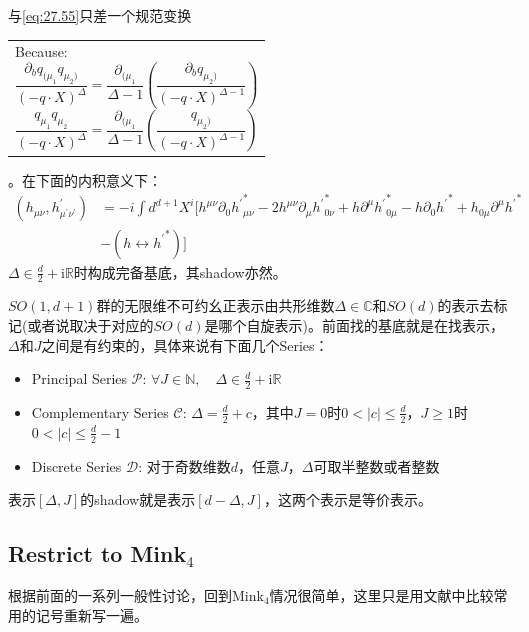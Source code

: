 与\ref{eq:27.55}只差一个规范变换\begin{margintable}\footnotesize 
	\begin{tabularx}{\marginparwidth}{|X}
		Because:
		\[\frac{\partial_bq_{(\mu_1}q_{\mu_2)}}{(-q\cdot X)^\Delta}=\frac{\partial_{(\mu_1}}{\Delta-1}\left(\frac{\partial_bq_{\mu_2)}}{(-q\cdot X)^{\Delta-1}}\right)\]
		\[\frac{q_{\mu_1}q_{\mu_2}}{(-q\cdot X)^\Delta}=\frac{\partial_{(\mu_1}}{\Delta-1}\left(\frac{q_{\mu_2)}}{(-q\cdot X)^{\Delta-1}}\right)\]
	\end{tabularx}
\end{margintable}。在下面的内积意义下：
\begin{equation}
	\begin{aligned}
		(h_{\mu\nu},h_{\mu^{\prime}\nu^{\prime}}^{\prime})& =-i\int d^{d+1}X^{i}\Big[h^{\mu\nu}\partial_{0}{h^{\prime}}_{\mu\nu}^{*}-2h^{\mu\nu}\partial_{\mu}{h^{\prime}}_{0\nu}^{*}+h\partial^{\mu}{h^{\prime}}_{0\mu}^{*}-h\partial_{0}{h^{\prime}}^{*}+h_{0\mu}{\partial^{\mu}{h^{\prime}}^{*}}  \\
		&-(h\leftrightarrow{h^{\prime}}^{*})\Big]
	\end{aligned}
\end{equation}
$\boxed{\Delta\in\frac{d}{2}+\mathrm{i}\mathbb{R}}$时构成完备基底，其shadow亦然。
\begin{remark}
	$SO(1,d+1)$群的无限维不可约幺正表示由共形维数$\Delta\in\mathbb{C}$和$SO(d)$的表示去标记(或者说取决于对应的$SO(d)$是哪个自旋表示)。前面找的基底就是在找表示，$\Delta$和$J$之间是有约束的，具体来说有下面几个Series：
	\begin{itemize}
		\item Principal Series $\mathcal{P}$: $\forall J\in\mathbb{N},\quad \Delta\in\frac{d}{2}+\mathrm{i}\mathbb{R}$
		\item Complementary Series $\mathcal{C}$: $\Delta=\frac{d}{2}+c$，其中$J=0$时$0<|c|\leq\frac{d}{2}$，$J\geq 1$时$0<|c|\leq\frac{d}{2}-1$
		\item Discrete Series $\mathcal{D}$: 对于奇数维数$d$，任意$J$，$\Delta$可取半整数或者整数
	\end{itemize}
	表示$[\Delta,J]$的shadow就是表示$[d-\Delta,J]$，这两个表示是等价表示。
\end{remark}
\newpage
\subsection{Restrict to Mink$_{4}$}
根据前面的一系列一般性讨论，回到Mink$_{4}$情况很简单，这里只是用文献中比较常用的记号重新写一遍。

